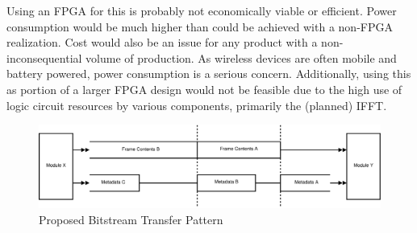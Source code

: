 Using an FPGA for this is probably not economically viable or efficient. Power consumption would be much higher than could be achieved with a non-FPGA realization. Cost would also be an issue for any product with a non-inconsequential volume of production. As wireless devices are often  mobile and battery powered, power consumption is a serious concern. Additionally, using this as portion of a larger FPGA design would not be feasible due to the high use of logic circuit resources by various components, primarily the (planned) IFFT.


\begin{figure}
\includegraphics[width=\linewidth]{conclution_metadata_transfer}
\caption{Proposed Bitstream Transfer Pattern	}
\label{fig:alt-bitstream}
\end{figure}
